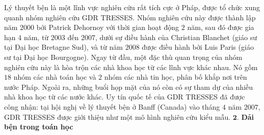 \begin{multicols}{2}
	\vskip 0.1cm
	Lý thuyết bện là một lĩnh vực nghiên cứu rất tích cực ở Pháp, được tổ chức xung quanh nhóm nghiên cứu GDR TRESSES. Nhóm nghiên cứu này được thành lập năm $2000$ bởi Patrick Dehornoy với thời gian hoạt động $2$ năm, sau đó được gia hạn $4$ năm, từ $2003$ đến $2007$, dưới sự điều hành của Christian Blanchet (giáo sư tại Đại học Bretagne Sud), và từ năm $2008$ được điều hành bởi Luis Paris (giáo sư tại Đại học Bourgogne). Ngay từ đầu, một đặc thù quan trọng của nhóm nghiên cứu này là hòa trộn các nhà khoa học từ các lĩnh vực khác nhau. Nó gồm $18$ nhóm các nhà toán học và $2$ nhóm các nhà tin học, phân bố khắp nơi trên nước Pháp. Ngoài ra, những buổi họp mặt của nó còn có sự tham dự của nhiều nhà khoa học từ các nước khác. Uy tín quốc tế của GDR TRESSES đã được công nhận: tại hội nghị về lý thuyết bện ở Banff (Canada) vào tháng $4$ năm $2007$, GDR TRESSES được giới thiệu như một mô hình nghiên cứu kiểu mẫu.
	\vskip 0.1cm
	\vskip 0.1cm
	$\pmb{2.}$ \textbf{\color{duongvaotoanhoc}Dải bện trong toán học}

\end{multicols}
